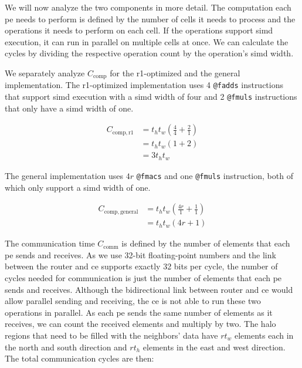 We will now analyze the two components in more detail. The computation each \ac{pe} needs to perform is defined by the number of cells it needs to process and the operations it needs to perform on each cell. If the operations support \ac{simd} execution, it can run in parallel on multiple cells at once. We can calculate the cycles by dividing the respective operation count by the operation's \ac{simd} width.

We separately analyze $C_{\mathrm{comp}}$ for the r1-optimized and the general implementation. The r1-optimized implementation uses 4 \texttt{@fadds} instructions that support \ac{simd} execution with a \ac{simd} width of four and 2 \texttt{@fmuls} instructions that only have a \ac{simd} width of one.

\begin{equation}
    \begin{aligned}
        \label{eq:c_comp_r1}
        C_{\mathrm{comp,r1}} &= t_h t_w \left(\frac{4}{4} + \frac{2}{1}\right) \\[1ex]
        &= t_h t_w \left(1 + 2\right) \\[1ex]
        &= 3 t_h t_w
    \end{aligned}
\end{equation}

The general implementation uses $4r$ \texttt{@fmacs} and one \texttt{@fmuls} instruction, both of which only support a \ac{simd} width of one.

\begin{equation}
    \label{eq:c_comp_general}
    \begin{aligned}
        C_{\mathrm{comp,general}} &= t_h t_w \left(\frac{4r}{1} + \frac{1}{1}\right) \\[1ex]
        &= t_h t_w \left(4r + 1\right)
    \end{aligned}
\end{equation}


The communication time $C_{\mathrm{comm}}$ is defined by the number of elements that each \ac{pe} sends and receives. As we use 32-bit floating-point numbers and the link between the router and \ac{ce} supports exactly 32 bits per cycle, the number of cycles needed for communication is just the number of elements that each \ac{pe} sends and receives. Although the bidirectional link between router and \ac{ce} would allow parallel sending and receiving, the \ac{ce} is not able to run these two operations in parallel. As each \ac{pe} sends the same number of elements as it receives, we can count the received elements and multiply by two. The halo regions that need to be filled with the neighbors' data have $r t_w$ elements each in the north and south direction and $r t_h$ elements in the east and west direction. The total communication cycles are then:

